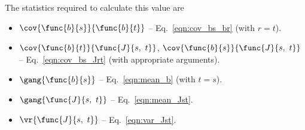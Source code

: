 The statistics required to calculate this value are

\begin{itemize}
	\item [] $\cov{\func{b}{s}}{\func{b}{t}}$ -- Eq.~\ref{eqn:cov_bs_br} (with $r = t$).
	\item [] $\cov{\func{b}{t}}{\func{J}{s,\ t}}$, $\cov{\func{b}{s}}{\func{J}{s,\ t}}$ -- Eq.~\ref{eqn:cov_bs_Jrt} (with appropriate arguments).
	\item [] $\gang{\func{b}{s}}$ -- Eq.~\ref{eqn:mean_b} (with $t = s$).
	\item [] $\gang{\func{J}{s,\ t}}$ -- Eq.~\ref{eqn:mean_Jst}.
	\item [] $\vr{\func{J}{s,\ t}}$ -- Eq.~\ref{eqn:var_Jst}.
\end{itemize}


